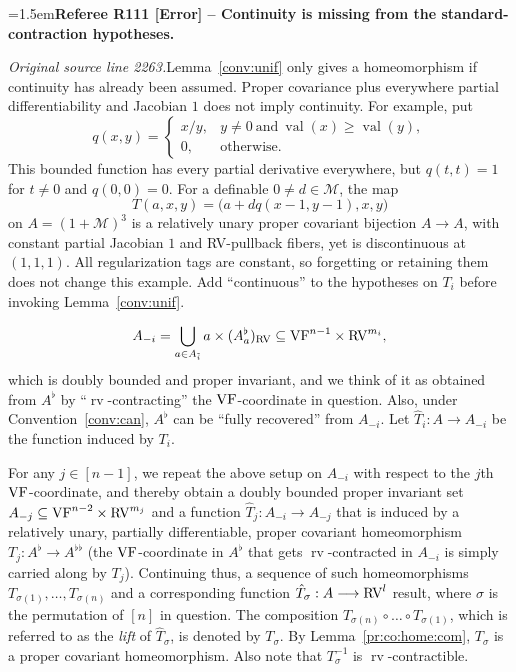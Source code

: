 \documentclass[12pt]{amsart}
\newcommand{\RefereeRemark}[4]{%
  \par\medskip\begingroup\normalfont\small\color{RefereePurple}%
  \emergencystretch=1.5em\noindent\textbf{Referee R#1 [#2] -- #3.}\par\nobreak\noindent #4\par
  \endgroup\medskip
}
\newcommand{\memph}[1]{{\color{magenta}\emph{#1}}}
\theoremstyle{plain}
\theoremstyle{definition}
\theoremstyle{remark}
\numberwithin{equation}{section}
\theoremstyle{plain}
\newcommand{\VF}{\textup{VF}}
\newcommand{\RV}{\textup{RV}}
\newcommand{\MM}{\mdl M}
\newcommand{\0}{\emptyset}
\newcommand{\mdl}[1]{\mathcal{#1}}  %
\newcommand{\fun}{\longrightarrow}
\newcommand{\sub}{\subseteq}
\DeclareMathOperator{\rv}{rv}
\DeclareMathOperator{\vv}{val}
\begin{document}
\RefereeRemark{111}{Error}{Continuity is missing from the standard-contraction hypotheses}{%
\textit{Original source line 2263.}\quad Lemma~\ref{conv:unif} only gives a homeomorphism if continuity has already been assumed. Proper covariance plus everywhere partial differentiability and Jacobian $1$ does not imply continuity. For example, put
\[
q(x,y)=\begin{cases}x/y,&y\ne0\ \text{and}\ \vv(x)\geq\vv(y),\\0,&\text{otherwise}.\end{cases}
\]
This bounded function has every partial derivative everywhere, but $q(t,t)=1$ for $t\ne0$ and $q(0,0)=0$. For a definable $0\ne d\in\MM$, the map
\[
T(a,x,y)=\bigl(a+dq(x-1,y-1),x,y\bigr)
\]
on $A=(1+\MM)^3$ is a relatively unary proper covariant bijection $A\to A$, with constant partial Jacobian $1$ and RV-pullback fibers, yet is discontinuous at $(1,1,1)$. All regularization tags are constant, so forgetting or retaining them does not change this example. Add ``continuous'' to the hypotheses on $T_i$ before invoking Lemma~\ref{conv:unif}.
}
\[
 A_{-i} = \bigcup_{a \in A_{\tilde i}} a \times (A_{a}^\flat)_{\RV} \sub \VF^{n-1} \times \RV^{m_i},
\]
which is doubly bounded and proper invariant, and  we think of it as obtained from $A^\flat$ by ``$\rv$-contracting'' the $\VF$-coordinate in question.  Also, under Convention~\ref{conv:can}, $A^\flat$ can be ``fully recovered'' from  $A_{-i}$. Let $\hat T_i : A \fun A_{-i}$ be the function induced by $T_i$.

For any $j \in [n{-}1]$, we repeat the above setup on $A_{-i}$ with respect to the $j$th $\VF$-coordinate, and thereby obtain a doubly bounded proper invariant set $A_{-j} \sub \VF^{n-2} \times \RV^{m_j}$ and a function $\hat T_{j} : A_{-i} \fun A_{-j}$ that is induced by a relatively unary, partially differentiable, proper covariant homeomorphism $T_j : A^\flat \fun A^{\flat\flat}$ (the $\VF$-coordinate in $A^\flat$ that gets $\rv$-contracted in $A_{-i}$ is simply carried along by $T_j$). Continuing thus,  a sequence of such homeomorphisms  $T_{\sigma(1)}, \ldots, T_{\sigma(n)}$ and a corresponding function $\hat T_{\sigma} : A \fun \RV^{l}$ result, where $\sigma$ is the permutation of $[n]$ in question. The composition $T_{\sigma(n)} \circ \ldots \circ T_{\sigma(1)}$, which is referred to as the \memph{lift} of $\hat T_{\sigma}$, is denoted by $T_{\sigma}$. By Lemma~\ref{pr:co:home:com}, $T_{\sigma}$ is a proper covariant homeomorphism. Also note that $T^{-1}_{\sigma}$ is $\rv$-contractible.
\end{document}
